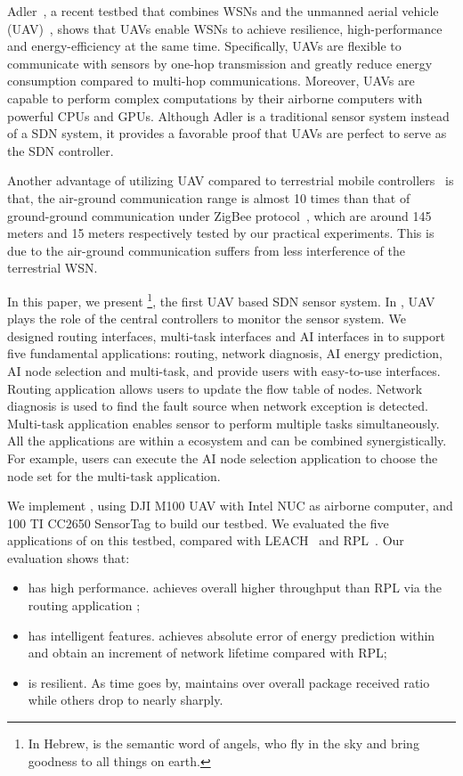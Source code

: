Adler~\cite{Alder}, a recent testbed that combines WSNs
and the unmanned aerial vehicle (UAV)~\cite{Cambone2005Unmanned, Perry2000Unmanned, Cathcart2014Method},
shows that UAVs enable WSNs to achieve resilience, 
high-performance and energy-efficiency at the same time.
Specifically, UAVs are flexible to 
communicate with sensors by one-hop transmission
and greatly reduce energy consumption compared to multi-hop communications.
Moreover, UAVs are capable to perform complex computations 
by their airborne computers with powerful CPUs and GPUs.
Although Adler is a traditional sensor system instead of a SDN system, 
it provides a favorable proof
that UAVs are perfect to serve as the SDN controller.

Another advantage of utilizing UAV compared to
terrestrial mobile controllers~\cite{Somasundara2007Mobile} is that, the air-ground communication range
is almost 10 times than that of ground-ground communication under ZigBee protocol~\cite{Farahani2008ZigBee}, which are
around 145 meters and 15 meters respectively tested by our practical experiments.
This is due to the air-ground communication suffers from less interference of the terrestrial WSN.

In this paper, we present {\sdn}\footnote{In Hebrew, {\sdn} is the semantic word of angels, who fly in the sky and bring goodness to all things on earth. }, 
the first UAV based SDN sensor system.
In {\sdn}, UAV plays the role of the central controllers to monitor the sensor system.
We designed routing interfaces, multi-task interfaces and AI interfaces in {\sdn} to support
five fundamental applications: routing, network diagnosis, 
AI energy prediction, AI node selection and multi-task,
and provide users with easy-to-use interfaces.
Routing application allows users to update the flow table of nodes.
Network diagnosis is used to find the fault source when network exception is detected.
Multi-task application enables sensor to perform multiple 
tasks simultaneously. All the applications are within a ecosystem
and can be combined synergistically. For example,
users can execute the AI node selection application to choose
the node set for the multi-task application. 


We implement {\sdn}, using DJI M100 UAV with Intel NUC as airborne computer, 
and 100 TI CC2650 SensorTag to build our testbed.
We evaluated the five applications of  {\sdn} on this testbed, 
compared with LEACH~\cite{kaur2016wsn} and RPL~\cite{winter2012rpl}.
Our evaluation shows that:
\begin{itemize}
	\item[1)] {\sdn} has high performance. {\sdn} achieves overall {\simpleTput} higher
		throughput than RPL via the routing application ;
	\item[2)] {\sdn} has intelligent features. {\sdn} achieves absolute error of energy prediction within {\Error} 
		and obtain an {\totalLife} increment of network lifetime compared with RPL;
	\item[3)] {\sdn} is resilient. As time goes by, {\sdn} maintains over
		{\pktRecvRatio} overall package received ratio while others drop to nearly {\OpktRecvRatio}
		sharply.
\end{itemize}

